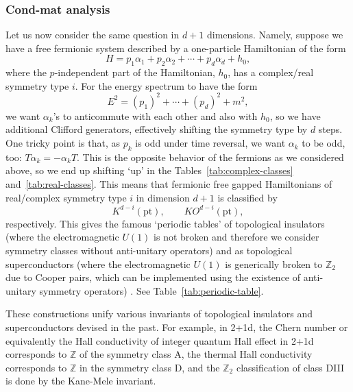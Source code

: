 \documentclass[12pt]{article}
\numberwithin{equation}{section}
\numberwithin{figure}{section}
\theoremstyle{remark}
\def\bZ{\mathbb{Z}}
\def\pt{\mathrm{pt}}
\begin{document}
\subsubsection{Cond-mat analysis}
Let us now consider the same question in $d+1$ dimensions.
Namely, suppose we have a free fermionic system
described by a one-particle Hamiltonian of the form \begin{equation}
H = p_1 \alpha_1 + p_2 \alpha_2 +\cdots + p_d \alpha_d + h_0,
\label{gen-hamiltonian}
\end{equation}
where the $p$-independent part of the Hamiltonian, $h_0$, has a complex/real symmetry type $i$.
For the energy spectrum to have the form \begin{equation}
E^2 = (p_1)^2 + \cdots + (p_d)^2 + m^2,
\end{equation} we want $\alpha_k$'s to anticommute with each other and also with $h_0$,
so we have additional Clifford generators, effectively shifting the symmetry type by $d$ steps.
One tricky point is that, as $p_k$ is odd under time reversal,
 we want $\alpha_k$ to be odd, too: $T\alpha_k = -\alpha_k T$.
 This is the opposite behavior of the fermions as we considered above,
 so we end up shifting `up' in the Tables~\ref{tab:complex-classes} and~\ref{tab:real-classes}.
This means that fermionic free gapped Hamiltonians of real/complex symmetry type $i$ 
in dimension $d+1$ is classified by \begin{equation}
K^{d-i}(\pt),\qquad KO^{d-i}(\pt),
\end{equation} respectively. 
This gives the famous `periodic tables' of 
 topological insulators (where the electromagnetic $U(1)$ is not broken and therefore
we consider symmetry classes without anti-unitary operators)
and as topological superconductors (where the electromagnetic $U(1)$ is generically broken to $\bZ_2$ 
due to Cooper pairs, which can be implemented using the existence of anti-unitary symmetry operators) \cite{Kitaev:2009mg,Schnyder:2008tya,Ryu:2010zza}.
See Table~\ref{tab:periodic-table}.

These constructions unify various invariants of topological insulators and superconductors devised in the past.
For example, in 2+1d, the Chern number or equivalently the Hall conductivity
of integer quantum Hall effect in 2+1d 
corresponds to $\bZ$ of the symmetry class A,
the thermal Hall conductivity 
corresponds to $\bZ$ in the symmetry class D,
and the $\bZ_2$ classification of class DIII is done by  the Kane-Mele invariant.
  
\end{document}
